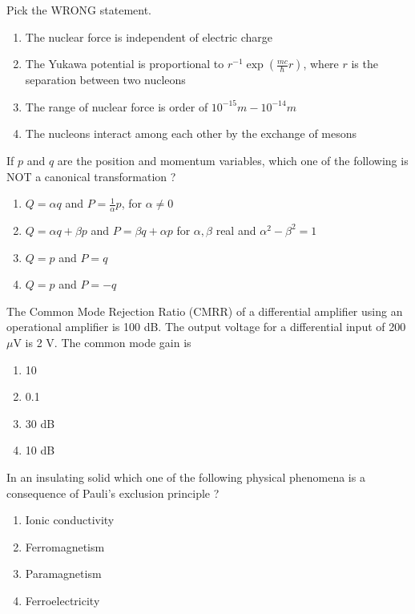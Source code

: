     \item Pick the WRONG statement.
    \begin{enumerate}
        \item The nuclear force is independent of electric charge
        \item The Yukawa potential is proportional to $r^{-1} \exp\left(\frac{mc}{\hbar} r\right)$, where $r$ is the separation between two nucleons
        \item The range of nuclear force is order of $10^{-15}m-10^{-14}m$
        \item The nucleons interact among each other by the exchange of mesons
    \end{enumerate}
    \item If $p$ and $q$ are the position and momentum variables, which one of the following is NOT a canonical transformation ?
    \begin{enumerate}
        \item $Q=\alpha q$ and $P= \frac{1}{\alpha}p$, for $\alpha \neq 0$
        \item $Q=\alpha q+\beta p$ and $P=\beta q+\alpha p$ for $\alpha,\beta$ real and $\alpha^2-\beta^2=1$
        \item $Q=p$ and $P=q$
        \item $Q=p$ and $P=-q$
    \end{enumerate}
    \item The Common Mode Rejection Ratio (CMRR) of a differential amplifier using an operational amplifier is 100 dB. The output voltage for a differential input of 200 $\mu$V is 2 V. The common mode gain is
    \begin{enumerate}
        \item 10
        \item 0.1
        \item 30 dB
        \item 10 dB
    \end{enumerate}
    \item In an insulating solid which one of the following physical phenomena is a consequence of Pauli's exclusion principle ?
    \begin{enumerate}
        \item Ionic conductivity
        \item Ferromagnetism
        \item Paramagnetism
        \item Ferroelectricity
    \end{enumerate}
